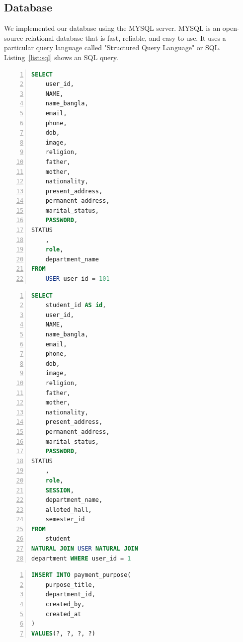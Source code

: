 \subsection{Database}\label{sub:database}
We implemented our database using the MYSQL server. MYSQL is an open-source relational database that is fast, reliable, and easy to use. It uses a particular query language called "Structured Query Language" or SQL.
Listing~\ref{list:sql} shows an SQL query. 
\begin{lstlisting}[caption={A SQL query to find a User}, label=list:sql, captionpos=b,
           backgroundcolor=\color{white},
           language=SQL,
           breaklines=true,
           frame=single,
           showspaces=false,
           basicstyle=\ttfamily,
           numbers=left,
           numberstyle=\tiny,
           rulecolor=\color{red},
           keywordstyle=\color{blue},
           commentstyle=\color{gray}
        ]
SELECT
    user_id,
    NAME,
    name_bangla,
    email,
    phone,
    dob,
    image,
    religion,
    father,
    mother,
    nationality,
    present_address,
    permanent_address,
    marital_status,
    PASSWORD,
STATUS
    ,
    role,
    department_name
FROM
    USER user_id = 101
\end{lstlisting}
\begin{lstlisting}[caption={A SQL query to find a Student data}, label=list:sql, captionpos=b,
           backgroundcolor=\color{white},
           language=SQL,
           breaklines=true,
           frame=single,
           showspaces=false,
           basicstyle=\ttfamily,
           numbers=left,
           numberstyle=\tiny,
           rulecolor=\color{red},
           keywordstyle=\color{blue},
           commentstyle=\color{gray}
        ]
SELECT
    student_id AS id,
    user_id,
    NAME,
    name_bangla,
    email,
    phone,
    dob,
    image,
    religion,
    father,
    mother,
    nationality,
    present_address,
    permanent_address,
    marital_status,
    PASSWORD,
STATUS
    ,
    role,
    SESSION,
    department_name,
    alloted_hall,
    semester_id
FROM
    student
NATURAL JOIN USER NATURAL JOIN 
department WHERE user_id = 1
\end{lstlisting}
\begin{lstlisting}[caption={A SQL query to insert payment purpose}, label=list:sql, captionpos=b,
           backgroundcolor=\color{white},
           language=SQL,
           breaklines=true,
           frame=single,
           showspaces=false,
           basicstyle=\ttfamily,
           numbers=left,
           numberstyle=\tiny,
           rulecolor=\color{red},
           keywordstyle=\color{blue},
           commentstyle=\color{gray}
        ]
INSERT INTO payment_purpose(
    purpose_title,
    department_id,
    created_by,
    created_at
)
VALUES(?, ?, ?, ?)
\end{lstlisting}
